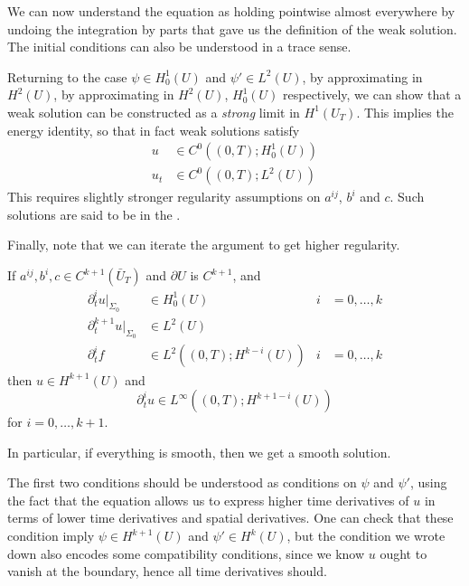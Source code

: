 \documentclass[a4paper]{article}
\begin{document}
We can now understand the equation as holding pointwise almost everywhere by undoing the integration by parts that gave us the definition of the weak solution. The initial conditions can also be understood in a trace sense.

Returning to the case $\psi \in H^1_0(U)$ and $\psi' \in L^2(U)$, by approximating in $H^2(U)$, by approximating in $H^2(U)$, $H_0^1(U)$ respectively, we can show that a weak solution can be constructed as a \emph{strong} limit in $H^1(U_T)$. This implies the energy identity, so that in fact weak solutions satisfy
\begin{align*}
  u &\in C^0((0, T); H_0^1(U))\\
  u_t &\in C^0((0, T); L^2(U))
\end{align*}
This requires slightly stronger regularity assumptions on $a^{ij}$, $b^i$ and $c$. Such solutions are said to be in the .

Finally, note that we can iterate the argument to get higher regularity.
\begin{thm}
  If $a^{ij}, b^i, c \in C^{k + 1}(\bar{U}_T)$ and $\partial U$ is $C^{k + 1}$, and
  \begin{align*}
    \partial^i_t u|_{\Sigma_0} &\in H_0^1 (U)&i &= 0, \ldots, k\\
    \partial_t^{k + 1}u |_{\Sigma_0} &\in L^2(U)\\
    \partial_t^i f &\in L^2((0, T); H^{k - i}(U)) & i &= 0, \ldots, k
  \end{align*}
  then $u \in H^{k + 1}(U)$ and
  \[
    \partial_t^i u \in L^\infty((0, T); H^{k + 1 - i}(U))
  \]
  for $i = 0, \ldots, k + 1$.

  In particular, if everything is smooth, then we get a smooth solution.
\end{thm}
The first two conditions should be understood as conditions on $\psi$ and $\psi'$, using the fact that the equation allows us to express higher time derivatives of $u$ in terms of lower time derivatives and spatial derivatives. One can check that these condition imply $\psi \in H^{k + 1}(U)$ and $\psi' \in H^k(U)$, but the condition we wrote down also encodes some compatibility conditions, since we know $u$ ought to vanish at the boundary, hence all time derivatives should.

\end{document}
